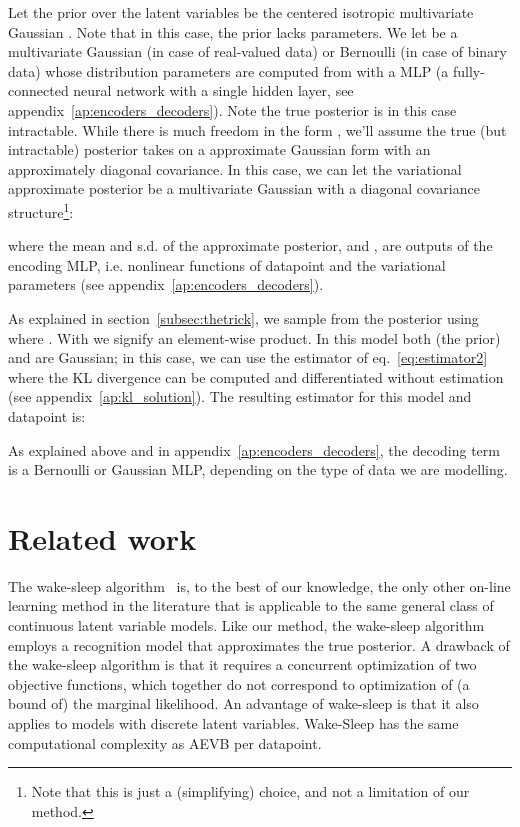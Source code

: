 \documentclass{article} \usepackage{nips13submit_e,times}
\theoremstyle{definition}
\theoremstyle{definition}
\begin{document}
Let the prior over the latent variables be the centered isotropic multivariate Gaussian . Note that in this case, the prior lacks parameters. We let  be a multivariate Gaussian (in case of real-valued data) or Bernoulli (in case of binary data) whose distribution parameters are computed from  with a MLP (a fully-connected neural network with a single hidden layer, see appendix~\ref{ap:encoders_decoders}). Note the true posterior  is in this case intractable.
While there is much freedom in the form , we'll assume the true (but intractable) posterior takes on a approximate Gaussian form with an approximately diagonal covariance. In this case, we can let the variational approximate posterior be a multivariate Gaussian with a diagonal covariance structure\footnote{Note that this is just a (simplifying) choice, and not a limitation of our method.}:

where the mean and s.d. of the approximate posterior,  and , are outputs of the encoding MLP, i.e. nonlinear functions of datapoint  and the variational parameters  (see appendix~\ref{ap:encoders_decoders}).

As explained in section~\ref{subsec:thetrick}, we sample from the posterior  using  where . With  we signify an element-wise product.
In this model both  (the prior) and  are Gaussian; in this case, we can use the estimator of eq.~\eqref{eq:estimator2} where the KL divergence can be computed and differentiated without estimation (see appendix~\ref{ap:kl_solution}). The resulting estimator for this model and datapoint  is:

As explained above and in appendix~\ref{ap:encoders_decoders}, the decoding term  is a Bernoulli or Gaussian MLP, depending on the type of data we are modelling.

\section{Related work}
The wake-sleep algorithm~\cite{hinton1995wake} is, to the best of our knowledge, the only other on-line learning method in the literature that is applicable to the same general class of continuous latent variable models. Like our method, the wake-sleep algorithm employs a recognition model that approximates the true posterior. A drawback of the wake-sleep algorithm is that it requires a concurrent optimization of two objective functions, which together do not correspond to optimization of (a bound of) the marginal likelihood.
An advantage of wake-sleep is that it also applies to models with discrete latent variables. Wake-Sleep has the same computational complexity as AEVB per datapoint.
\end{document}
